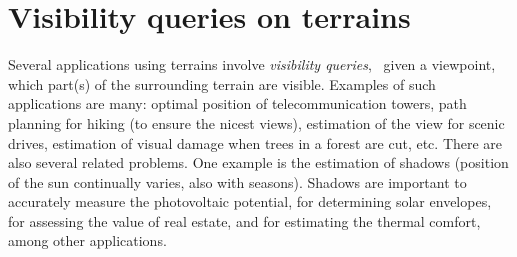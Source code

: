 
\setchapterpreamble[u]{\margintoc}


\chapter{Visibility queries on terrains}%
\label{chap:visibility}

\graphicspath{{visibility/}}




Several applications using terrains involve \emph{visibility queries}, \ie\ given a viewpoint, which part(s) of the surrounding terrain are visible.
Examples of such applications are many: optimal position of telecommunication towers, path planning for hiking (to ensure the nicest views), estimation of the view for scenic drives, estimation of visual damage when trees in a forest are cut, etc.
There are also several related problems.
One example is the estimation of shadows (position of the sun continually varies, also with seasons).
Shadows are important to accurately measure the photovoltaic potential, for determining solar envelopes, for assessing the value of real estate, and for estimating the thermal comfort, among other applications.

%

